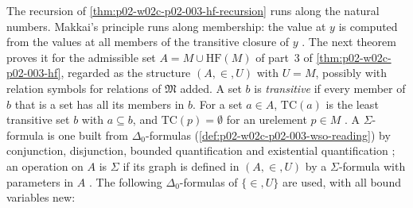 The recursion of \cref{thm:p02-w02c-p02-003-hf-recursion} runs along the
natural numbers.  Makkai's principle runs along membership: the value at
\(y\) is computed from the values at all members of the transitive
closure of \(y\) \cite[ch.~A.7, \S2, 2.16--2.17, p.~243]{Makkai1977}.  The
next theorem proves it for the admissible set \(A=M\cup\mathrm{HF}(M)\) of
part~3 of \cref{thm:p02-w02c-p02-003-hf}, regarded as the structure
\((A,\in,U)\) with \(U=M\), possibly with relation symbols for relations
of \(\mathfrak M\) added.  A set \(b\) is \emph{transitive} if every member
of \(b\) that is a set has all its members in \(b\).  For a set \(a\in
A\), \(\mathrm{TC}(a)\) is the least transitive set \(b\) with
\(a\subseteq b\), and \(\mathrm{TC}(p)=\emptyset\) for an urelement
\(p\in M\) \cite[ch.~A.7, \S2, p.~242]{Makkai1977}.  A
\(\Sigma\)-formula is one built from \(\Delta_0\)-formulas
(\cref{def:p02-w02c-p02-003-wso-reading}) by conjunction, disjunction,
bounded quantification and existential quantification
\cite[ch.~A.7, \S2, 2.5, p.~239]{Makkai1977}; an operation on \(A\) is
\(\Sigma\) if its graph is defined in \((A,\in,U)\) by a
\(\Sigma\)-formula with parameters in \(A\)
\cite[ch.~A.7, \S2, 2.8, p.~240]{Makkai1977}.  The following
\(\Delta_0\)-formulas of \(\{\in,U\}\) are used, with all bound variables
new:
